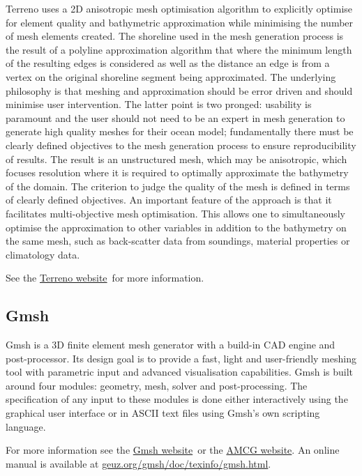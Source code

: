 Terreno uses a 2D anisotropic mesh optimisation algorithm to explicitly optimise for 
element quality and bathymetric approximation while minimising the number of mesh
elements created. The shoreline used in the mesh generation process is the result 
of a polyline approximation algorithm that where the minimum length of the resulting 
edges is considered as well as the distance an edge is from a vertex on the original 
shoreline segment being approximated. The underlying philosophy is that meshing and 
approximation should be error driven and should minimise user intervention. The 
latter point is two pronged: usability is paramount and the user should not need 
to be an expert in mesh generation to generate high quality meshes for their ocean 
model; fundamentally there must be clearly defined objectives to the mesh generation 
process to ensure reproducibility of results. The result is an unstructured mesh, 
which may be anisotropic, which focuses resolution where it is required to optimally 
approximate the bathymetry of the domain. The criterion to judge the quality of the 
mesh is defined in terms of clearly defined objectives. An important feature of the 
approach is that it facilitates multi-objective mesh optimisation. This allows one to 
simultaneously optimise the approximation to other variables in addition to the 
bathymetry on the same mesh, such as back-scatter data from soundings, material 
properties or climatology data. 

See the \href{http://amcg.ese.ic.ac.uk/terreno}{Terreno website}\ for more information.

\subsection{Gmsh}

Gmsh is a 3D finite element mesh generator with a build-in CAD engine and post-processor.
Its design goal is to provide a fast, light and user-friendly meshing tool with parametric
input and advanced visualisation capabilities. Gmsh is built around four modules: geometry, 
mesh, solver and post-processing. The specification of any input to these modules is done
either interactively using the graphical user interface or in ASCII text files using Gmsh's
own scripting language. 

For more information see the \href{http://geuz.org/gmsh/}{Gmsh website}\ or the \href{http://amcg.ese.ic.ac.uk}{AMCG
website}. An online manual is available at \href{http://geuz.org/gmsh/doc/texinfo/gmsh.html}{geuz.org/gmsh/doc/texinfo/gmsh.html}.

